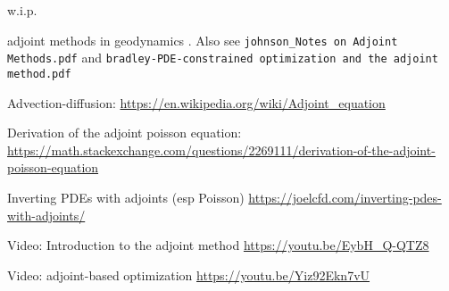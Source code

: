 
{\Large w.i.p.}

adjoint methods in geodynamics \cite{bugs09,ghbu16,hobo14,isks07,ligs17,wahg15,wama09,wosp14}.
Also see {\tt johnson\_Notes on Adjoint Methods.pdf} and {\tt bradley-PDE-constrained optimization and the adjoint method.pdf} 

Advection-diffusion: \url{https://en.wikipedia.org/wiki/Adjoint_equation}

Derivation of the adjoint poisson equation: \url{https://math.stackexchange.com/questions/2269111/derivation-of-the-adjoint-poisson-equation}

Inverting PDEs with adjoints (esp Poisson) \url{https://joelcfd.com/inverting-pdes-with-adjoints/}

Video: Introduction to the adjoint method \url{https://youtu.be/EybH_Q-QTZ8}

Video: adjoint-based optimization \url{https://youtu.be/Yiz92Ekn7vU}
